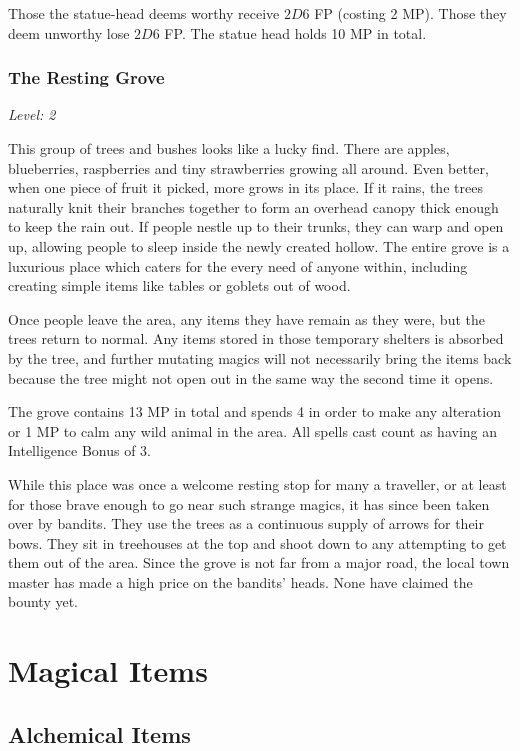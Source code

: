 Those the statue-head deems worthy receive $2D6$ FP (costing 2 MP).  Those they deem unworthy lose $2D6$ FP.  The statue head holds 10 MP in total.

\subsubsection{The Resting Grove}

\textit{Level: 2}

This group of trees and bushes looks like a lucky find.  There are apples, blueberries, raspberries and tiny strawberries growing all around.  Even better, when one piece of fruit it picked, more grows in its place.  If it rains, the trees naturally knit their branches together  to form an overhead canopy thick enough to keep the rain out.  If people nestle up to their trunks, they can warp and open up, allowing people to sleep inside the newly created hollow.  The entire grove is a luxurious place which caters for the every need of anyone within, including creating simple items like tables or goblets out of wood.

Once people leave the area, any items they have remain as they were, but the trees return to normal.  Any items stored in those temporary shelters is absorbed by the tree, and further mutating magics will not necessarily bring the items back because the tree might not open out in the same way the second time it opens.

The grove contains 13 MP in total and spends 4 in order to make any alteration or 1 MP to calm any wild animal in the area.  All spells cast count as having an Intelligence Bonus of 3.

While this place was once a welcome resting stop for many a traveller, or at least for those brave enough to go near such strange magics, it has since been taken over by bandits.  They use the trees as a continuous supply of arrows for their bows.  They sit in treehouses at the top and shoot down to any attempting to get them out of the area.  Since the grove is not far from a major road, the local town master has made a high price on the bandits' heads.  None have claimed the bounty yet.

\section{Magical Items}

\subsection{Alchemical Items}

